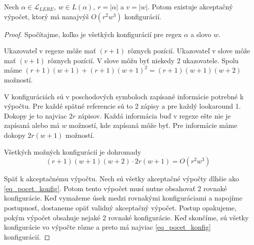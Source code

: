 \documentclass{svk_long_sk}
\def\lel{\mathscr{L}_{LERE}}
\begin{document}
\begin{lemma}\label{lema_dlzka_post_konfig}
Nech $\alpha \in \lel,~ w \in L(\alpha),~ r = |\alpha|$ a $v = |w|$. Potom existuje akceptačný výpočet, ktorý má nanajvýš $O(r^2w^3)$ konfigurácií.
\end{lemma}
\begin{proof}
Spočítajme, koľko je všetkých konfigurácií pre regex $\alpha$ a slovo $w$.

Ukazovateľ v regexe môže mať $(r+1)$ rôznych pozícií. Ukazovateľ v slove môže mať $(v+1)$ rôznych pozícií. V slove môžu byť niekedy 2 ukazovatele. Spolu máme $(r+1)(w+1)+(r+1)(w+1)^2 = (r+1)(w+1)(w+2)$ možností.

V konfiguráciách sú v poschodových symboloch zapísané informácie potrebné k výpočtu. Pre každé spätné referencie sú to 2 zápisy a pre každý lookaround 1. Dokopy je to najviac $2r$ zápisov. Každá informácia buď v regexe ešte nie je zapísaná alebo má $w$ možností, kde zapísaná môže byť. Pre informácie máme dokopy $2r(w+1)$ možností.

Všetkých možných konfigurácií je dohromady
\begin{equation}\label{eq_pocet_konfig}
(r+1)(w+1)(w+2)\cdot 2r(w+1) = O(r^2w^3)
\end{equation}

Späť k akceptačnému výpočtu. Nech sú všetky akceptačné výpočty dlhšie ako \eqref{eq_pocet_konfig}. Potom tento výpočet musí nutne obsahovať 2 rovnaké konfigurácie. Keď vymažeme úsek medzi rovnakými konfiguráciami a napojíme postupnosť, dostaneme opäť validný akceptačný výpočet. Postup opakujeme, pokým výpočet obsahuje nejaké 2 rovnaké konfigurácie. Keď skončíme, sú všetky konfigurácie vo výpočte rôzne a preto má najviac \eqref{eq_pocet_konfig} konfigurácií.
\end{proof}
\end{document}
